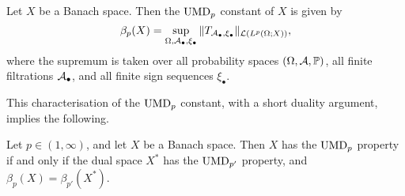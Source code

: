 \begin{prop}\label{prop:UMD-signtransforms}
  Let $X$ be a Banach space.
  Then the $\mathrm{UMD}_{p}$ constant of $X$ is given by
  \begin{equation*}
    \beta_{p}(X) = \sup_{\Omega,\mathcal{A}_{\bullet}, \xi_{\bullet}}  \|T_{\mathcal{A}_{\bullet}, \xi_{\bullet}}\|_{\mathcal{L}(L^p(\Omega;X))},
  \end{equation*}
  where the supremum is taken over all probability spaces $(\Omega,\mathcal{A},\mathbb{P})$, all finite filtrations $\mathcal{A}_{\bullet}$, and all finite sign sequences $\xi_{\bullet}$.
\end{prop}

This characterisation of the $\mathrm{UMD}_{p}$ constant, with a short duality argument, implies the following.

\begin{prop}\label{prop:UMD-duality}
  Let $p \in (1,\infty)$, and let $X$ be a Banach space.
  Then $X$ has the $\mathrm{UMD}_{p}$ property if and only if the dual space $X^{*}$ has the $\mathrm{UMD}_{p'}$ property, and $\beta_{p}(X) = \beta_{p'}(X^{*})$.
\end{prop}

